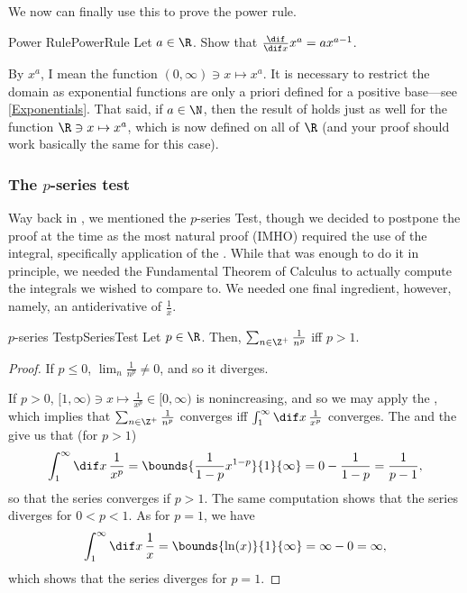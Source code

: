 We now can finally use this to prove the power rule.
\begin{exr}{Power Rule}{PowerRule}
Let $a\in \R$.  Show that $\frac{\dif}{\dif x}x^a=ax^{a-1}$.
\begin{rmk}
By $x^a$, I mean the function $(0,\infty )\ni x\mapsto x^a$.  It is necessary to restrict the domain as exponential functions are only a priori defined for a positive base---see \cref{Exponentials}.  That said, if $a\in \N$, then the result of holds just as well for the function $\R \ni x\mapsto x^a$, which is now defined on all of $\R$ (and your proof should work basically the same for this case).
\end{rmk}
\end{exr}

\subsubsection{The \texorpdfstring{$p$}{p}-series test}

Way back in , we mentioned the $p$-series Test, though we decided to postpone the proof at the time as the most natural proof (IMHO) required the use of the integral, specifically application of the .  While that was enough to do it in principle, we needed the Fundamental Theorem of Calculus to actually compute the integrals we wished to compare to.  We needed one final ingredient, however, namely, an antiderivative of $\frac{1}{x}$.
\begin{prp}{$p$-series Test}{pSeriesTest}
Let $p\in \R$.  Then, $\sum _{n\in \Z ^+}\frac{1}{n^p}$ iff $p>1$.
\begin{proof}
If $p\leq 0$, $\lim _n\frac{1}{n^p}\neq 0$, and so it diverges.

If $p>0$, $[1,\infty) \ni x\mapsto \frac{1}{x^p}\in [0,\infty )$ is nonincreasing, and so we may apply the , which implies that $\sum _{n\in \Z ^+}\frac{1}{n^p}$ converges iff $\int _1^{\infty}\dif x\, \frac{1}{x^p}$ converges.  The  and the  give us that (for $p>1$)
\begin{equation}
\int _1^{\infty}\dif x\, \frac{1}{x^p}=\bounds{\frac{1}{1-p}x^{1-p}}{1}{\infty}=0-\frac{1}{1-p}=\frac{1}{p-1},
\end{equation}
so that the series converges if $p>1$.  The same computation shows that the series diverges for $0<p<1$.  As for $p=1$, we have
\begin{equation}
\int _1^{\infty}\dif x\, \frac{1}{x}=\bounds{\ln (x)}{1}{\infty}=\infty -0=\infty ,
\end{equation}
which shows that the series diverges for $p=1$.
\end{proof}
\end{prp}

